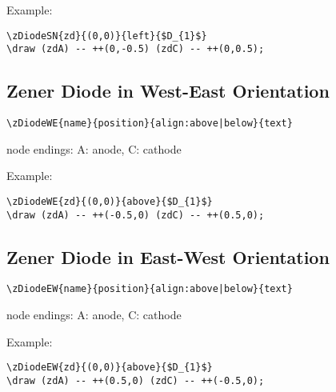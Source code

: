\documentclass[parskip=full]{scrartcl}
\begin{document}
Example:\\
\begin{minipage}{0.8\textwidth}
\begin{verbatim}
\zDiodeSN{zd}{(0,0)}{left}{$D_{1}$}
\draw (zdA) -- ++(0,-0.5) (zdC) -- ++(0,0.5);
\end{verbatim}
\end{minipage}
\begin{minipage}{0.19\textwidth}
\end{minipage}

\subsection{Zener Diode in West-East Orientation}

\begin{verbatim}
\zDiodeWE{name}{position}{align:above|below}{text}
\end{verbatim}
node endings: A: anode, C: cathode

Example:\\
\begin{minipage}{0.8\textwidth}
\begin{verbatim}
\zDiodeWE{zd}{(0,0)}{above}{$D_{1}$}
\draw (zdA) -- ++(-0.5,0) (zdC) -- ++(0.5,0);
\end{verbatim}
\end{minipage}
\begin{minipage}{0.19\textwidth}
\end{minipage}

\subsection{Zener Diode in East-West Orientation}

\begin{verbatim}
\zDiodeEW{name}{position}{align:above|below}{text}
\end{verbatim}
node endings: A: anode, C: cathode

Example:\\
\begin{minipage}{0.8\textwidth}
\begin{verbatim}
\zDiodeEW{zd}{(0,0)}{above}{$D_{1}$}
\draw (zdA) -- ++(0.5,0) (zdC) -- ++(-0.5,0);
\end{verbatim}
\end{minipage}
\begin{minipage}{0.19\textwidth}
\end{minipage}
\end{document}
